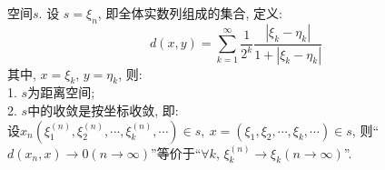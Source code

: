 \documentclass[lang=cn,10pt]{gorgeousnbook}
\numberwithin{equation}{section}%
\numberwithin{figure}{section}%
\begin{document}
\begin{exercise}
空间$s$. 设 $s = {{\xi_n}}$, 即全体实数列组成的集合, 定义:
  \begin{equation}
    d(x,y) = \sum_{k=1}^{\infty}{\frac{1}{2^k}\frac{\left| \xi _k-\eta _k \right|}{1+\left| \xi _k-\eta _k \right|}}
    \nonumber
  \end{equation}
其中, $x={\xi_k}$, $y = {\eta_k}$, 则: \\
1. $s$为距离空间;\\
2. $s$中的收敛是按坐标收敛, 即:\\
设$x_n\left( \xi _{1}^{\left( n \right)},\xi _{2}^{\left( n \right)},\cdots ,\xi _{k}^{\left( n \right)},\cdots \right) \in s,\ x=\left( \xi _1,\xi _2,\cdots ,\xi _k,\cdots \right) \in s
$, 则“$d(x_n,x)\rightarrow 0(n\rightarrow\infty)$”等价于“$\forall k$, $\xi _{k}^{\left( n \right)} \rightarrow \xi_k (n\rightarrow \infty)$”.
\end{exercise}
\end{document}
